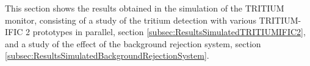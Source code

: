 This section shows the results obtained in the simulation of the TRITIUM monitor, consisting of a study of the tritium detection with various TRITIUM-IFIC 2 prototypes in parallel, section \ref{subsec:ResultsSimulatedTRITIUMIFIC2}, and a study of the effect of the background rejection system, section \ref{subsec:ResultsSimulatedBackgroundRejectionSystem}.